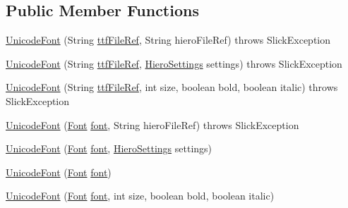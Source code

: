 \subsection*{Public Member Functions}
\begin{DoxyCompactItemize}
\item 
\mbox{\hyperlink{classorg_1_1newdawn_1_1slick_1_1_unicode_font_acb84ea3da65e6ac55ce2283bc71e41cf}{Unicode\+Font}} (String \mbox{\hyperlink{classorg_1_1newdawn_1_1slick_1_1_unicode_font_a2f13dde71bdabcab77c49030a4af17f2}{ttf\+File\+Ref}}, String hiero\+File\+Ref)  throws Slick\+Exception 
\item 
\mbox{\hyperlink{classorg_1_1newdawn_1_1slick_1_1_unicode_font_ae27fb59e09fc918fef115481089debf5}{Unicode\+Font}} (String \mbox{\hyperlink{classorg_1_1newdawn_1_1slick_1_1_unicode_font_a2f13dde71bdabcab77c49030a4af17f2}{ttf\+File\+Ref}}, \mbox{\hyperlink{classorg_1_1newdawn_1_1slick_1_1font_1_1_hiero_settings}{Hiero\+Settings}} settings)  throws Slick\+Exception 
\item 
\mbox{\hyperlink{classorg_1_1newdawn_1_1slick_1_1_unicode_font_a45cb814b2f8c0ec1e8dbc92c4594b33f}{Unicode\+Font}} (String \mbox{\hyperlink{classorg_1_1newdawn_1_1slick_1_1_unicode_font_a2f13dde71bdabcab77c49030a4af17f2}{ttf\+File\+Ref}}, int size, boolean bold, boolean italic)  throws Slick\+Exception 
\item 
\mbox{\hyperlink{classorg_1_1newdawn_1_1slick_1_1_unicode_font_a2938aa78cf120174206531d82df2b69c}{Unicode\+Font}} (\mbox{\hyperlink{interfaceorg_1_1newdawn_1_1slick_1_1_font}{Font}} \mbox{\hyperlink{classorg_1_1newdawn_1_1slick_1_1_unicode_font_a956ab491839be375d47444a67ebff11c}{font}}, String hiero\+File\+Ref)  throws Slick\+Exception 
\item 
\mbox{\hyperlink{classorg_1_1newdawn_1_1slick_1_1_unicode_font_ac0a63b0fe968143afee7f78911e5030e}{Unicode\+Font}} (\mbox{\hyperlink{interfaceorg_1_1newdawn_1_1slick_1_1_font}{Font}} \mbox{\hyperlink{classorg_1_1newdawn_1_1slick_1_1_unicode_font_a956ab491839be375d47444a67ebff11c}{font}}, \mbox{\hyperlink{classorg_1_1newdawn_1_1slick_1_1font_1_1_hiero_settings}{Hiero\+Settings}} settings)
\item 
\mbox{\hyperlink{classorg_1_1newdawn_1_1slick_1_1_unicode_font_a7fffd4b694c8c4c749feba89f8d9eba7}{Unicode\+Font}} (\mbox{\hyperlink{interfaceorg_1_1newdawn_1_1slick_1_1_font}{Font}} \mbox{\hyperlink{classorg_1_1newdawn_1_1slick_1_1_unicode_font_a956ab491839be375d47444a67ebff11c}{font}})
\item 
\mbox{\hyperlink{classorg_1_1newdawn_1_1slick_1_1_unicode_font_a19c849491394423ffa20c374d7484e59}{Unicode\+Font}} (\mbox{\hyperlink{interfaceorg_1_1newdawn_1_1slick_1_1_font}{Font}} \mbox{\hyperlink{classorg_1_1newdawn_1_1slick_1_1_unicode_font_a956ab491839be375d47444a67ebff11c}{font}}, int size, boolean bold, boolean italic)

\end{DoxyCompactItemize}
